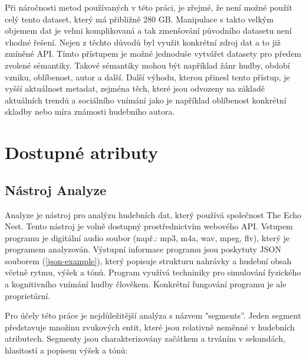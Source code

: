 \documentclass[thesis=M,czech]{FITthesis}[2012/06/26]
\begin{document}
	Při náročnosti metod používaných v této práci, je zřejmé, že není možné použít celý tento dataset, který má přibližně 280 GB. Manipulace s takto velkým objemem dat je velmi komplikovaná a tak zmenšování původního datasetu není vhodné řešení. Nejen z těchto důvodů byl využit konkrétní zdroj dat a to již zmíněné API. Tímto přístupem je možné jednoduše vytvářet datasety pro předem zvolené sémantiky. Takové sémantiky mohou být například žánr hudby, období vzniku, oblíbenost, autor a další. Další výhodu, kterou přinesl tento přístup, je vyšší aktuálnost metadat, zejména těch, které jsou odvozeny na základě aktuálních trendů a sociálního vnímání jako je například oblíbenost konkrétní skladby nebo míra známosti hudebního autora.
	
\section{Dostupné atributy}
\subsection{Nástroj Analyze}

Analyze je nástroj pro analýzu hudebních dat, který používá společnost The Echo Nest. 
Tento nástroj je volně dostupný prostřednictvím webového API. Vstupem programu je digitální audio soubor (např.:  mp3, m4a, wav, mpeg, flv), který je programem analyzován. Výstupní informace programu jsou poskytuty JSON souborem (\ref{json-example}), který popisuje strukturu nahrávky a hudební obsah včetně rytmu, výšek a tónů. Program využívá techniniky pro simulování fyzického a kognitivního vnímání hudby člověkem. Konkrétní fungování programu je ale proprietární. 

 Pro účely této práce je nejdůležitější analýza s názvem "segments”. Jeden segment představuje množinu zvukových entit, které jsou relativně neměnné v hudebních atributech. Segmenty jsou charakterizovány začátkem a trváním v sekundách, hlasitostí a popisem výšek a tónů:
\end{document}
